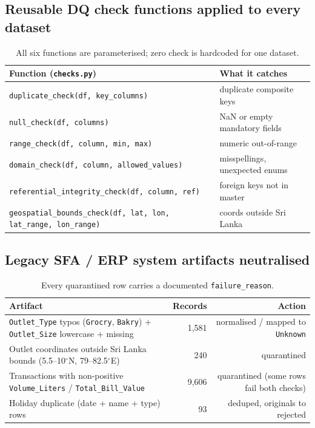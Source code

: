 \documentclass[10pt,a4paper]{article}
\begin{document}
\subsection{Reusable DQ check functions applied to every dataset}

\begin{table}[H]
\centering
\renewcommand{\arraystretch}{1.05}
\begin{tabularx}{\textwidth}{lX}
\toprule
\rowcolor{soft}\textbf{Function (\texttt{checks.py})} & \textbf{What it catches} \\
\midrule
\texttt{duplicate\_check(df, key\_columns)}                                & duplicate composite keys \\
\texttt{null\_check(df, columns)}                                          & NaN or empty mandatory fields \\
\texttt{range\_check(df, column, min, max)}                                & numeric out-of-range \\
\texttt{domain\_check(df, column, allowed\_values)}                        & misspellings, unexpected enums \\
\texttt{referential\_integrity\_check(df, column, ref)}                    & foreign keys not in master \\
\texttt{geospatial\_bounds\_check(df, lat, lon, lat\_range, lon\_range)}   & coords outside Sri Lanka \\
\bottomrule
\end{tabularx}
\caption{All six functions are parameterised; zero check is hardcoded for one dataset.}
\end{table}

\subsection{Legacy SFA / ERP system artifacts neutralised}

\begin{table}[H]
\centering
\renewcommand{\arraystretch}{1.05}
\begin{tabularx}{\textwidth}{Xrr}
\toprule
\rowcolor{soft}\textbf{Artifact} & \textbf{Records} & \textbf{Action} \\
\midrule
\texttt{Outlet\_Type} typos (\texttt{Grocry}, \texttt{Bakry}) + \texttt{Outlet\_Size} lowercase + missing & 1{,}581 & normalised / mapped to \texttt{Unknown} \\
Outlet coordinates outside Sri Lanka bounds (5.5--10$^\circ$N, 79--82.5$^\circ$E) & 240 & quarantined \\
Transactions with non-positive \texttt{Volume\_Liters} / \texttt{Total\_Bill\_Value} & 9{,}606 & quarantined (some rows fail both checks) \\
Holiday duplicate (date + name + type) rows                          & 93    & deduped, originals to rejected \\
\bottomrule
\end{tabularx}
\caption{Every quarantined row carries a documented \texttt{failure\_reason}.}
\end{table}
\end{document}
